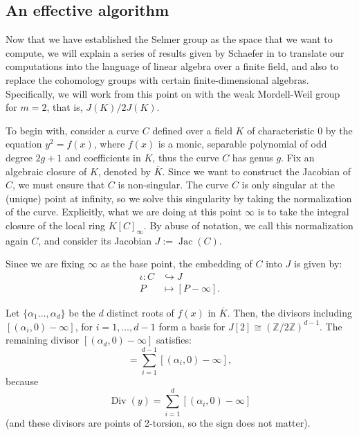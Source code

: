 \documentclass[a4paper, 12pt]{amsart}
\theoremstyle{definition}
\theoremstyle{plain}
\theoremstyle{plain}
\theoremstyle{plain}
\theoremstyle{plain}
\theoremstyle{remark}
\theoremstyle{remark}
\theoremstyle{plain}
\newcommand{\Zmod}[1]{\mathbb{Z}/#1\mathbb{Z}}
\DeclareMathOperator{\Div}{Div}
\DeclareMathOperator{\Jac}{Jac}
\begin{document}
	\subsection{An effective algorithm}
	
	Now that we have established the Selmer group as the space that we want to compute, we will explain a series of results given by Schaefer in \cite{Schaefer_1995} to translate our computations into the language of linear algebra over a finite field, and also to replace the cohomology groups with certain finite-dimensional algebras. Specifically, we will work from this point on with the weak Mordell-Weil group for $m=2$, that is, $J(K)/2J(K)$.
	
	To begin with, consider a curve $C$ defined over a field $K$ of characteristic 0 by the equation $y^2=f(x)$, where $f(x)$ is a monic, separable polynomial of odd degree $2g+1$ and coefficients in $K$, thus the curve $C$ has genus $g$. Fix an algebraic closure of $K$, denoted by $\overline{K}$. Since we want to construct the Jacobian of $C$, we must ensure that $C$ is non-singular. The curve $C$ is only singular at the (unique) point at infinity, so we solve this singularity by taking the normalization of the curve. Explicitly, what we are doing at this point $\infty$ is to take the integral closure of the local ring $K[C]_\infty$. By abuse of notation, we call this normalization again $C$, and consider its Jacobian $J:=\Jac(C)$.
	
	Since we are fixing $\infty$ as the base point, the embedding of $C$ into $J$ is given by:
	\begin{align*}
		\iota:C&\hookrightarrow J\\
		P&\mapsto [P-\infty].
	\end{align*}
	
	Let $\{\alpha_1\ldots,\alpha_d\}$ be the $d$ distinct roots of $f(x)$ in $\overline{K}$. Then, the divisors including $[(\alpha_i,0)-\infty]$, for $i=1,\ldots,d-1$ form a basis for $J[2]\cong (\Zmod{2})^{d-1}$. The remaining divisor $[(\alpha_d,0)-\infty]$ satisfies:
	\begin{equation*}
		[(\alpha_d,0)-\infty]=\sum_{i=1}^{d-1}[(\alpha_i,0)-\infty],
	\end{equation*}
	because
	\begin{equation*}
		\Div(y)=\sum_{i=1}^{d}[(\alpha_i,0)-\infty]
	\end{equation*}
	(and these divisors are points of 2-torsion, so the sign does not matter).
	
\end{document}

